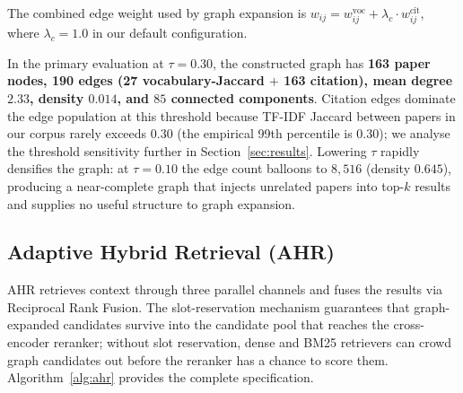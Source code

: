 \documentclass[journal]{IEEEtran}
\begin{document}
The combined edge weight used by graph expansion is
$w_{ij} = w^{\mathrm{voc}}_{ij} + \lambda_{c} \cdot w^{\mathrm{cit}}_{ij}$,
where $\lambda_c = 1.0$ in our default configuration.

In the primary evaluation at $\tau=0.30$, the constructed graph has
\textbf{163 paper nodes, 190 edges (27 vocabulary-Jaccard $+$ 163
citation), mean degree $2.33$, density $0.014$, and $85$ connected
components}. Citation edges dominate the edge population at this
threshold because TF-IDF Jaccard between papers in our corpus rarely
exceeds $0.30$ (the empirical 99th percentile is $0.30$); we analyse
the threshold sensitivity further in Section~\ref{sec:results}.
Lowering $\tau$ rapidly densifies the graph: at $\tau=0.10$ the edge
count balloons to $8{,}516$ (density $0.645$), producing a near-complete
graph that injects unrelated papers into top-$k$ results and supplies
no useful structure to graph expansion.

\subsection{Adaptive Hybrid Retrieval (AHR)}
\label{sec:ahr}
AHR retrieves context through three parallel channels and fuses the
results via Reciprocal Rank Fusion. The slot-reservation mechanism
guarantees that graph-expanded candidates survive into the candidate
pool that reaches the cross-encoder reranker; without slot reservation,
dense and BM25 retrievers can crowd graph candidates out before the
reranker has a chance to score them. Algorithm~\ref{alg:ahr} provides
the complete specification.
\end{document}

